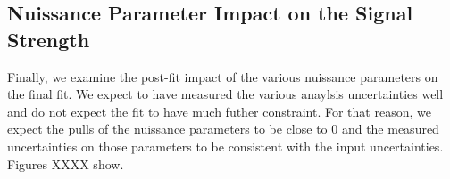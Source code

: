 \subsection{Nuissance Parameter Impact on the Signal Strength}

Finally, we examine the post-fit impact of the various nuissance parameters on the final fit. We expect to have measured the various anaylsis uncertainties well and do not expect the fit to have much futher constraint. For that reason, we expect the pulls of the nuissance parameters to be close to 0 and the measured uncertainties on those parameters to be consistent with the input uncertainties. 
Figures XXXX show. 



